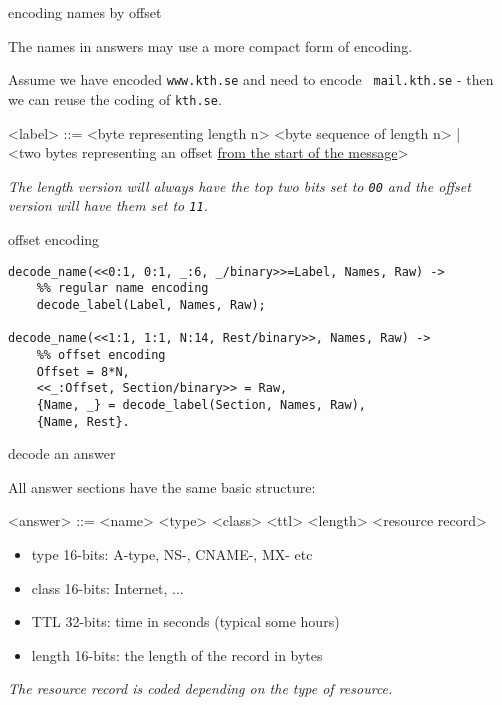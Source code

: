 \begin{frame}{encoding names by offset}

The names in answers may use a more compact form of encoding.  

\vspace{20pt}\pause

Assume we have encoded {\tt www.kth.se} and need to encode {\tt
  mail.kth.se} - then we can reuse the coding of {\tt kth.se}.

\vspace{20pt} \pause

\begin{grammar}
<label> ::=  <byte representing length n> <byte sequence of length n> | \\
             <two bytes representing an offset \underline{ from the start of the message}>
\end{grammar}


\vspace{20pt} \pause


{\em The length version will always have the top two bits set to {\tt 00} and the offset version will have them set to {\tt 11}.}

\end{frame}

\begin{frame}[fragile]{offset encoding}

\begin{verbatim}
decode_name(<<0:1, 0:1, _:6, _/binary>>=Label, Names, Raw) -> 
    %% regular name encoding
    decode_label(Label, Names, Raw);
      
decode_name(<<1:1, 1:1, N:14, Rest/binary>>, Names, Raw) ->
    %% offset encoding
    Offset = 8*N,    
    <<_:Offset, Section/binary>> = Raw,
    {Name, _} = decode_label(Section, Names, Raw),
    {Name, Rest}.
\end{verbatim}

\end{frame}

\begin{frame}[fragile]{decode an answer}

All answer sections have the same basic structure:

\begin{grammar}
<answer> ::= <name> <type> <class> <ttl> <length> <resource record>
\end{grammar}

\begin{itemize}
\item type 16-bits: A-type, NS-, CNAME-, MX- etc
\item class 16-bits: Internet, ...
\item TTL 32-bits: time in seconds (typical some hours)
\item length 16-bits: the length of the record in bytes
\end{itemize}

\vspace{10pt}\pause
{\em The resource record is coded depending on the type of resource.}

\end{frame}


